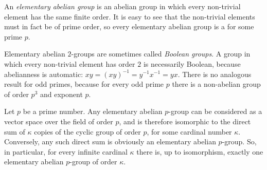 \documentclass[12pt]{article}
\begin{document}

An \emph{elementary abelian group} is an abelian group in which every non-trivial element has the same finite order. It is easy to see that the non-trivial elements must in fact be of prime order, so every elementary abelian group is a  for some prime $p$.

Elementary abelian $2$-groups are sometimes called \emph{Boolean groups}.
A group in which every non-trivial element has order $2$ is necessarily Boolean, because abelianness is automatic: $xy=(xy)^{-1}=y^{-1}x^{-1}=yx$.
There is no analogous result for odd primes, because for every odd prime $p$ there is a non-abelian group of order $p^3$ and exponent $p$.

Let $p$ be a prime number.
Any elementary abelian $p$-group can be considered as a vector space over the field of order $p$, and is therefore isomorphic to the direct sum of $\kappa$ copies of the cyclic group of order $p$, for some cardinal number $\kappa$. Conversely, any such direct sum is obviously an elementary abelian $p$-group.
So, in particular, for every infinite cardinal $\kappa$ there is, up to isomorphism, exactly one elementary abelian $p$-group of order $\kappa$.
\end{document}
